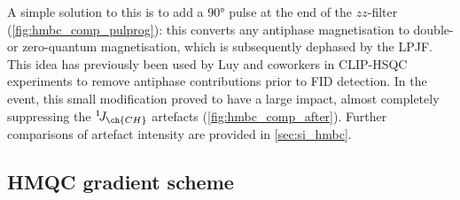 \documentclass[a4paper,11pt]{article}
\newcommand{\carbon}{\ch{^{13}C}}
\newcommand{\nitrogen}{\ch{^{15}N}}
\newcommand{\onejch}{{}^1\!J_{\ch{CH}}}
\begin{document}
\begin{refsection}
A simple solution to this is to add a \carbon{} \ang{90} pulse at the end of the \(zz\)-filter (\cref{fig:hmbc_comp_pulprog}): this converts any antiphase magnetisation to double- or zero-quantum magnetisation, which is subsequently dephased by the LPJF.
This idea has previously been used by Luy and coworkers in CLIP-HSQC experiments to remove antiphase contributions prior to FID detection.\autocite{Enthart2008JMR}
In the event, this small modification proved to have a large impact, almost completely suppressing the \(\onejch\) artefacts (\cref{fig:hmbc_comp_after}).
Further comparisons of artefact intensity are provided in \cref{sec:si_hmbc}.

\subsection{\texorpdfstring{\nitrogen{}}{15N} HMQC gradient scheme}


\end{refsection}
\end{document}

